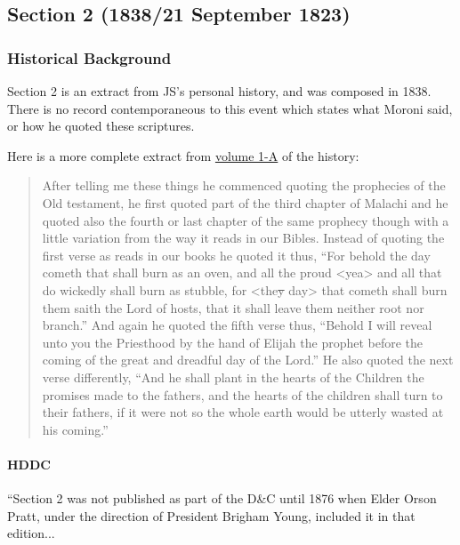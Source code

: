 \subsection{Section 2 (1838/21 September 1823)}
	\label{DC2}
	
	\subsubsection{Historical Background}
		\label{DC2-HB}
		
		Section 2 is an extract from JS's personal history, and was composed in 1838. There is no record contemporaneous to this event which states what Moroni said, or how he quoted these scriptures. 
		
		Here is a more complete extract from \href{https://www.josephsmithpapers.org/paper-summary/history-1838-1856-volume-a-1-23-december-1805-30-august-1834/5}{volume 1-A} of the history:
		
			\begin{quote}
				After telling me these things he commenced quoting the prophecies of the Old testament, he first quoted part of the third chapter of Malachi and he quoted also the fourth or last chapter of the same prophecy though with a little variation from the way it reads in our Bibles. Instead of quoting the first verse as reads in our books he quoted it thus, ``For behold the day cometh that shall burn as an oven, and all the proud <yea> and all that do wickedly shall burn as stubble, for <the\sout{y} day> that cometh shall burn them saith the Lord of hosts, that it shall leave them neither root nor branch.'' And again he quoted the fifth verse thus, ``Behold I will reveal unto you the Priesthood by the hand of Elijah the prophet before the coming of the great and dreadful day of the Lord.'' He also quoted the next verse differently, ``And he shall plant in the hearts of the Children the promises made to the fathers, and the hearts of the children shall turn to their fathers, if it were not so the whole earth would be utterly wasted at his coming.''
			\end{quote}
		
		\paragraph{HDDC}
		
			``Section 2 was not published as part of the D\&C until 1876 when Elder Orson Pratt, under the direction of President Brigham Young, included it in that edition...
			
